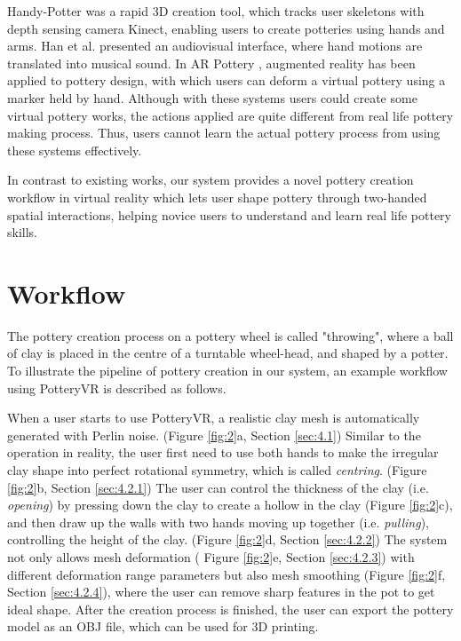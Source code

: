 Handy-Potter \cite{murugappan2013handy} was a rapid 3D creation tool, which tracks user skeletons with depth sensing camera Kinect, enabling users to create potteries using hands and arms.
Han et al. \cite{han2014virtual} presented an audiovisual interface, where hand motions are translated into musical sound.
In AR Pottery \cite{han2007ar}, augmented reality has been applied to pottery design, with which users can deform a virtual pottery using a marker held by hand.
Although with these systems users could create some virtual pottery works, the actions applied are quite different from real life pottery making process. Thus, users cannot learn the actual pottery process from using these systems effectively.

In contrast to existing works, our system provides a novel pottery creation workflow in virtual reality which lets user shape pottery through two-handed spatial interactions, helping novice users to understand and learn real life pottery skills.



\section{Workflow}
\label{sec:3}

The pottery creation process on a pottery wheel is called "throwing", where a ball of clay is placed in the centre of a turntable wheel-head, and shaped by a potter.
To illustrate the pipeline of pottery creation in our system, an example workflow using PotteryVR is described as follows.

When a user starts to use PotteryVR, a realistic clay mesh is automatically generated with Perlin noise. (Figure \ref{fig:2}a, Section \ref{sec:4.1})
Similar to the operation in reality, the user first need to use both hands to make the irregular clay shape into perfect rotational symmetry, which is called \textit{centring}. (Figure \ref{fig:2}b, Section \ref{sec:4.2.1})
The user can control the thickness of the clay (i.e. \textit{opening}) by pressing down the clay to create a hollow in the clay (Figure \ref{fig:2}c), 
and then draw up the walls with two hands moving up together (i.e. \textit{pulling}), controlling the height of the clay. (Figure \ref{fig:2}d, Section \ref{sec:4.2.2})
The system not only allows mesh deformation ( Figure \ref{fig:2}e, Section \ref{sec:4.2.3}) with different deformation range parameters but also mesh smoothing (Figure \ref{fig:2}f, Section \ref{sec:4.2.4}), where the user can remove sharp features in the pot to get ideal shape.
After the creation process is finished, the user can export the pottery model as an OBJ file, which can be used for 3D printing.

